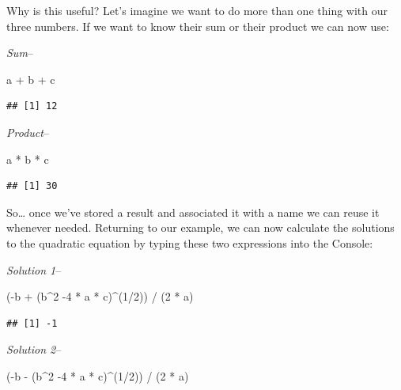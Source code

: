 \documentclass[
]{book}
\newenvironment{Shaded}{\begin{snugshade}}{\end{snugshade}}
\newcommand{\DecValTok}[1]{\textcolor[rgb]{0.00,0.00,0.81}{#1}}
\newcommand{\NormalTok}[1]{#1}
\newcommand{\SpecialCharTok}[1]{\textcolor[rgb]{0.00,0.00,0.00}{#1}}
\begin{document}
Why is this useful? Let's imagine we want to do more than one thing with our three numbers. If we want to know their sum or their product we can now use:

\emph{Sum}--

\begin{Shaded}
\begin{Highlighting}[]
\NormalTok{a }\SpecialCharTok{+}\NormalTok{ b }\SpecialCharTok{+}\NormalTok{ c}
\end{Highlighting}
\end{Shaded}

\begin{verbatim}
## [1] 12
\end{verbatim}

\emph{Product}--

\begin{Shaded}
\begin{Highlighting}[]
\NormalTok{a }\SpecialCharTok{*}\NormalTok{ b }\SpecialCharTok{*}\NormalTok{ c}
\end{Highlighting}
\end{Shaded}

\begin{verbatim}
## [1] 30
\end{verbatim}

So\ldots{} once we've stored a result and associated it with a name we can reuse it whenever needed. Returning to our example, we can now calculate the solutions to the quadratic equation by typing these two expressions into the Console:

\emph{Solution 1}--

\begin{Shaded}
\begin{Highlighting}[]
\NormalTok{(}\SpecialCharTok{{-}}\NormalTok{b }\SpecialCharTok{+}\NormalTok{ (b}\SpecialCharTok{\^{}}\DecValTok{2} \SpecialCharTok{{-}}\DecValTok{4} \SpecialCharTok{*}\NormalTok{ a }\SpecialCharTok{*}\NormalTok{ c)}\SpecialCharTok{\^{}}\NormalTok{(}\DecValTok{1}\SpecialCharTok{/}\DecValTok{2}\NormalTok{)) }\SpecialCharTok{/}\NormalTok{ (}\DecValTok{2} \SpecialCharTok{*}\NormalTok{ a)}
\end{Highlighting}
\end{Shaded}

\begin{verbatim}
## [1] -1
\end{verbatim}

\emph{Solution 2}--

\begin{Shaded}
\begin{Highlighting}[]
\NormalTok{(}\SpecialCharTok{{-}}\NormalTok{b }\SpecialCharTok{{-}}\NormalTok{ (b}\SpecialCharTok{\^{}}\DecValTok{2} \SpecialCharTok{{-}}\DecValTok{4} \SpecialCharTok{*}\NormalTok{ a }\SpecialCharTok{*}\NormalTok{ c)}\SpecialCharTok{\^{}}\NormalTok{(}\DecValTok{1}\SpecialCharTok{/}\DecValTok{2}\NormalTok{)) }\SpecialCharTok{/}\NormalTok{ (}\DecValTok{2} \SpecialCharTok{*}\NormalTok{ a)}
\end{Highlighting}
\end{Shaded}
\end{document}
